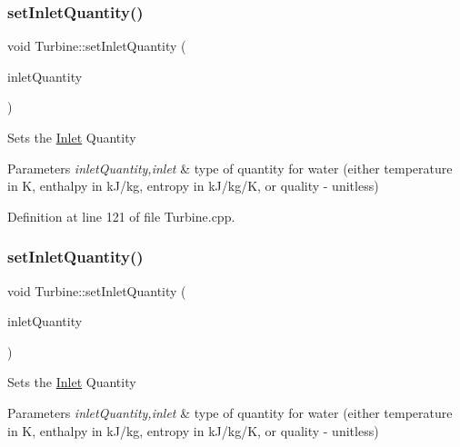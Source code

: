 \subsubsection{\texorpdfstring{set\+Inlet\+Quantity()}{setInletQuantity()}\hspace{0.1cm}{\footnotesize\ttfamily [1/3]}}
{\footnotesize\ttfamily void Turbine\+::set\+Inlet\+Quantity (\begin{DoxyParamCaption}\item[{\hyperlink{class_steam_properties_ae0294bedf7d178c2d8fb6aed0f62fbff}{Steam\+Properties\+::\+Thermodynamic\+Quantity}}]{inlet\+Quantity }\end{DoxyParamCaption})}

Sets the \hyperlink{class_inlet}{Inlet} Quantity


\begin{DoxyParams}{Parameters}
{\em inlet\+Quantity,inlet} & type of quantity for water (either temperature in K, enthalpy in k\+J/kg, entropy in k\+J/kg/K, or quality -\/ unitless) \\
\hline
\end{DoxyParams}


Definition at line 121 of file Turbine.\+cpp.

\mbox{\label{class_turbine_aecc05c70870fb11bbc0bb4fe5d8438bd}} 
\subsubsection{\texorpdfstring{set\+Inlet\+Quantity()}{setInletQuantity()}\hspace{0.1cm}{\footnotesize\ttfamily [2/3]}}
{\footnotesize\ttfamily void Turbine\+::set\+Inlet\+Quantity (\begin{DoxyParamCaption}\item[{\hyperlink{class_steam_properties_ae0294bedf7d178c2d8fb6aed0f62fbff}{Steam\+Properties\+::\+Thermodynamic\+Quantity}}]{inlet\+Quantity }\end{DoxyParamCaption})}

Sets the \hyperlink{class_inlet}{Inlet} Quantity


\begin{DoxyParams}{Parameters}
{\em inlet\+Quantity,inlet} & type of quantity for water (either temperature in K, enthalpy in k\+J/kg, entropy in k\+J/kg/K, or quality -\/ unitless) \\
\hline
\end{DoxyParams}
\mbox{\label{class_turbine_aecc05c70870fb11bbc0bb4fe5d8438bd}} 
